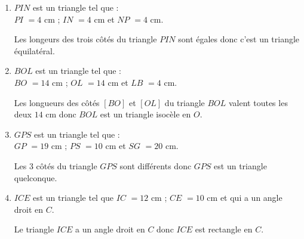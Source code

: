     \begin{enumerate}
        \item $PIN$ est un triangle tel que :\\$PI$ $= 4$ cm ; $IN$ $= 4$ cm et $NP$ $= 4$ cm.

        {\red Les longeurs des trois côtés du triangle $PIN$ sont égales donc c'est un triangle équilatéral.}
        \item $BOL$ est un triangle tel que :\\$BO$ $= 14$ cm ; $OL$ $= 14$ cm et $LB$ $= 4$ cm.

        {\red Les longueurs des côtés $[BO]$ et $[OL]$ du triangle $BOL$ valent toutes les deux $14$ cm donc $BOL$ est un triangle isocèle en $O$.}
        \item $GPS$ est un triangle tel que :\\$GP$ $= 19$ cm ; $PS$ $= 10$ cm et $SG$ $= 20$ cm.

        {\red Les 3 côtés du triangle $GPS$ sont différents donc $GPS$ est un triangle quelconque.}
        \item $ICE$ est un triangle tel que $IC$ $= 12$ cm ; $CE$ $= 10$ cm et  qui a un angle droit en $C$.

        {\red Le triangle $ICE$ a un angle droit en $C$ donc $ICE$ est rectangle en $C$.}
    \end{enumerate}
